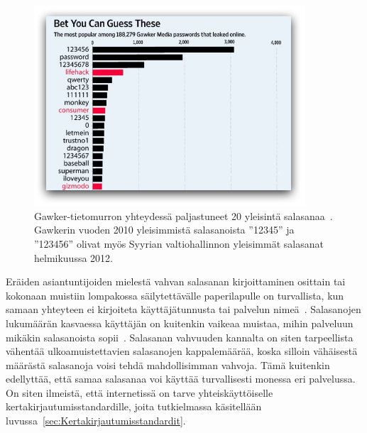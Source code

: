 \documentclass[finnish,gradu]{tktltiki}
\begin{document}
  \begin{figure}
    \centering
    \includegraphics[width=0.9\textwidth]{images/gawker_top20_passwords.jpg}
    \caption{Gawker-tietomurron yhteydessä paljastuneet 20 yleisintä salasanaa~\cite{wsj_gawker_12_2010}. Gawkerin vuoden 2010 yleisimmistä salasanoista ''12345'' ja ''123456'' olivat myös Syyrian valtiohallinnon yleisimmät salasanat helmikuussa 2012.}
    \label{fig:gawker_top20_passwords}
  \end{figure}

  Eräiden asiantuntijoiden mielestä vahvan salasanan kirjoittaminen osittain tai kokonaan muistiin lompakossa säilytettävälle paperilapulle on turvallista, kun samaan yhteyteen ei kirjoiteta käyttäjätunnusta tai palvelun nimeä~\cite{fsecure_passwords_on_postit_09, microsoft_guru_write_your_password_05, schneier_changing_passwords_10, schneier_choosing_passwords_07, schneier_write_down_your_password_05}. Salasanojen lukumäärän kasvaessa käyttäjän on kuitenkin vaikeaa muistaa, mihin palveluun mikäkin salasanoista sopii~\cite{study_of_passwords_07}. Salasanan vahvuuden kannalta on siten tarpeellista vähentää ulkoamuistettavien salasanojen kappalemäärää, koska silloin vähäisestä määrästä salasanoja voisi tehdä mahdollisimman vahvoja. Tämä kuitenkin edellyttää, että samaa salasanaa voi käyttää turvallisesti monessa eri palvelussa. On siten ilmeistä, että internetissä on tarve yhteiskäyttöiselle kertakirjautumisstandardille, joita tutkielmassa käsitellään luvussa~\ref{sec:Kertakirjautumisstandardit}.

\end{document}
